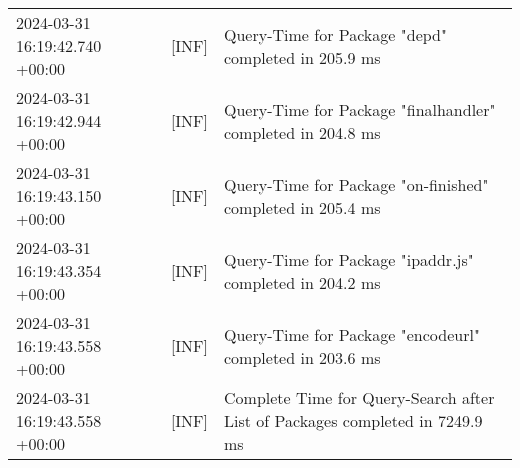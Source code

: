 {{\begin{tabularx}{\textwidth}{|l|l|X|}
                    2024-03-31 16:19:42.740 +00:00 & [INF] & Query-Time for Package "depd" completed in 205.9 ms \\
                    2024-03-31 16:19:42.944 +00:00 & [INF] & Query-Time for Package "finalhandler" completed in 204.8 ms \\
                    2024-03-31 16:19:43.150 +00:00 & [INF] & Query-Time for Package "on-finished" completed in 205.4 ms \\
                    2024-03-31 16:19:43.354 +00:00 & [INF] & Query-Time for Package "ipaddr.js" completed in 204.2 ms \\
                    2024-03-31 16:19:43.558 +00:00 & [INF] & Query-Time for Package "encodeurl" completed in 203.6 ms \\
                    2024-03-31 16:19:43.558 +00:00 & [INF] & Complete Time for Query-Search after List of Packages completed in 7249.9 ms \\
                    \hline
                \end{tabularx}
            }
        }

